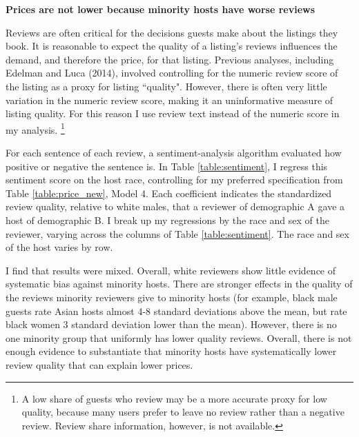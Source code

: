 \textbf{Prices are not lower because minority hosts have worse reviews} 

Reviews are often critical for the decisions guests make about the listings they book. It is reasonable to expect the quality of a listing's reviews influences the demand, and therefore the price, for that listing. Previous analyses, including Edelman and Luca (2014), involved controlling for the numeric review score of the listing as a proxy for listing ``quality". However, there is often very little variation in the numeric review score, making it an uninformative measure of listing quality. For this reason I use review text instead of the numeric score in my analysis.%
	\footnote{A low share of guests who review may be a more accurate proxy for low quality, because many users prefer to leave no review rather than a negative review. Review share information, however, is not available.} 

For each sentence of each review, a sentiment-analysis algorithm evaluated how positive or negative the sentence is. In Table \ref{table:sentiment}, I regress this sentiment score on the host race, controlling for my preferred specification from Table \ref{table:price_new}, Model 4. Each coefficient indicates the standardized review quality, relative to white males, that a reviewer of demographic A gave a host of demographic B. I break up my regressions by the race and sex of the reviewer, varying across the columns of Table \ref{table:sentiment}. The race and sex of the host varies by row. 


I find that results were mixed. Overall, white reviewers show little evidence of systematic bias against minority hosts. There are stronger effects in the quality of the reviews minority reviewers give to minority hosts (for example, black male guests rate Asian hosts almost 4-8 standard deviations above the mean, but rate black women 3 standard deviation lower than the mean). However, there is no one minority group that uniformly has lower quality reviews. Overall, there is not enough evidence to substantiate that minority hosts have systematically lower review quality that can explain lower prices. 

